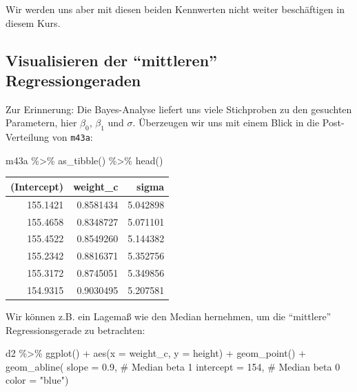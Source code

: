 \documentclass[
  a4paper,
  DIV=11]{scrreprt}
\newenvironment{Shaded}{\begin{snugshade}}{\end{snugshade}}
\newcommand{\AttributeTok}[1]{\textcolor[rgb]{0.40,0.45,0.13}{#1}}
\newcommand{\CommentTok}[1]{\textcolor[rgb]{0.37,0.37,0.37}{#1}}
\newcommand{\DecValTok}[1]{\textcolor[rgb]{0.68,0.00,0.00}{#1}}
\newcommand{\FloatTok}[1]{\textcolor[rgb]{0.68,0.00,0.00}{#1}}
\newcommand{\FunctionTok}[1]{\textcolor[rgb]{0.28,0.35,0.67}{#1}}
\newcommand{\NormalTok}[1]{\textcolor[rgb]{0.00,0.23,0.31}{#1}}
\newcommand{\SpecialCharTok}[1]{\textcolor[rgb]{0.37,0.37,0.37}{#1}}
\newcommand{\StringTok}[1]{\textcolor[rgb]{0.13,0.47,0.30}{#1}}
\theoremstyle{definition}
\theoremstyle{remark}
\begin{document}
Wir werden uns aber mit diesen beiden Kennwerten nicht weiter
beschäftigen in diesem Kurs.

\hypertarget{visualisieren-der-mittleren-regressiongeraden}{%
\subsection{Visualisieren der ``mittleren''
Regressiongeraden}\label{visualisieren-der-mittleren-regressiongeraden}}

Zur Erinnerung: Die Bayes-Analyse liefert uns viele Stichproben zu den
gesuchten Parametern, hier \(\beta_0\), \(\beta_1\) und \(\sigma\).
Überzeugen wir uns mit einem Blick in die Post-Verteilung von
\texttt{m43a}:

\begin{Shaded}
\begin{Highlighting}[]
\NormalTok{m43a }\SpecialCharTok{\%\textgreater{}\%} 
  \FunctionTok{as\_tibble}\NormalTok{() }\SpecialCharTok{\%\textgreater{}\%} 
  \FunctionTok{head}\NormalTok{()}
\end{Highlighting}
\end{Shaded}

\begin{longtable}[]{@{}rrr@{}}
\toprule()
(Intercept) & weight\_c & sigma \\
\midrule()
\endhead
155.1421 & 0.8581434 & 5.042898 \\
155.4658 & 0.8348727 & 5.071101 \\
155.4522 & 0.8549260 & 5.144382 \\
155.2342 & 0.8816371 & 5.352756 \\
155.3172 & 0.8745051 & 5.349856 \\
154.9315 & 0.9030495 & 5.207581 \\
\bottomrule()
\end{longtable}

Wir können z.B. ein Lagemaß wie den Median hernehmen, um die
``mittlere'' Regressionsgerade zu betrachten:

\begin{Shaded}
\begin{Highlighting}[]
\NormalTok{d2 }\SpecialCharTok{\%\textgreater{}\%} 
  \FunctionTok{ggplot}\NormalTok{() }\SpecialCharTok{+}
  \FunctionTok{aes}\NormalTok{(}\AttributeTok{x =}\NormalTok{ weight\_c, }\AttributeTok{y =}\NormalTok{ height) }\SpecialCharTok{+}
  \FunctionTok{geom\_point}\NormalTok{() }\SpecialCharTok{+}
  \FunctionTok{geom\_abline}\NormalTok{(}
    \AttributeTok{slope =} \FloatTok{0.9}\NormalTok{,  }\CommentTok{\# Median beta 1}
    \AttributeTok{intercept =} \DecValTok{154}\NormalTok{,  }\CommentTok{\# Median beta 0}
    \AttributeTok{color =} \StringTok{"blue"}\NormalTok{)}
\end{Highlighting}
\end{Shaded}
\end{document}
